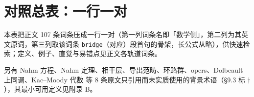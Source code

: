 \section{对照总表：一行一对}
\label{app:table}

本表把正文 107 条词条压成一行一对（第一列词条名即「数学侧」，第二列为其英文原词，第三列取该词条 \texttt{bridge}（对应）段首句的骨架，长公式从略），供快速检索；定义、例子、直觉与易错点见正文各轨道词条。

另有 Nahm 方程、Nahm 定理、相干层、导出范畴、环路群、opers、Dolbeault 上同调、Kac--Moody 代数 等 8 条原文只引用而未实质使用的背景术语（\S 9.3 标 $\dagger$），其最小可用定义见附录 B。

\begingroup
\footnotesize
\renewcommand{\arraystretch}{1.12}
